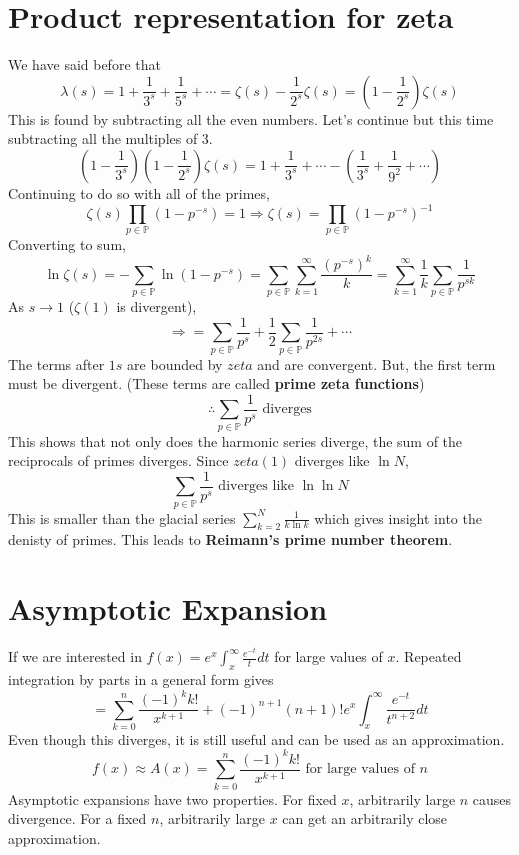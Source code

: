 \documentclass[../main.tex]{subfiles}
\begin{document}
\section{Product representation for zeta}
    We have said before that
    $$\lambda(s)=1+\frac{1}{3^{s}}+\frac{1}{5^{s}}+\cdots=\zeta(s)-\frac{1}{2^{s}}\zeta(s)=(1-\frac{1}{2^{s}})\zeta(s)$$
    This is found by subtracting all the even numbers. Let's continue but this time subtracting all the multiples of 3.
    $$(1-\frac{1}{3^{s}})(1-\frac{1}{2^{s}})\zeta(s)=1+\frac{1}{3^{s}}+\cdots-\left(\frac{1}{3^{s}}+\frac{1}{9^{2}}+\cdots\right)$$
    Continuing to do so with all of the primes,
    $$\zeta(s)\prod_{p\in\mathbb{P}}(1-p^{-s})=1\Rightarrow\boxed{\zeta(s)=\prod_{p\in\mathbb{P}}(1-p^{-s})^{-1}}$$
    Converting to sum,
    $$\ln\zeta(s)=-\sum_{p\in\mathbb{P}}\ln(1-p^{-s})=\sum_{p\in\mathbb{P}}\sum_{k=1}^{\infty}\frac{(p^{-s})^{k}}{k}=\sum_{k=1}^{\infty}\frac{1}{k}\sum_{p\in\mathbb{P}}\frac{1}{p^{sk}}$$
    As $s\rightarrow 1$ ($\zeta(1)$ is divergent),
    $$\Rightarrow=\sum_{p\in\mathbb{P}}\frac{1}{p^{s}}+\frac{1}{2}\sum_{p\in\mathbb{P}}\frac{1}{p^{2s}}+\cdots$$
    The terms after $1s$ are bounded by $zeta$ and are convergent. But, the first term must be divergent. (These terms are called \textbf{prime zeta functions})
    $$\boxed{\therefore\sum_{p\in\mathbb{P}}\frac{1}{p^{s}}\text{ diverges}}$$
    This shows that not only does the harmonic series diverge, the sum of the reciprocals of primes diverges. Since $zeta(1)$ diverges like $\ln N$,
    $$\sum_{p\in\mathbb{P}}\frac{1}{p^{s}}\text{ diverges like }\ln\ln N$$
    This is smaller than the glacial series $\sum_{k=2}^{N}\frac{1}{k\ln k}$ which gives insight into the denisty of primes. This leads to \textbf{Reimann's prime number theorem}.

\section{Asymptotic Expansion}
If we are interested in $f(x)=e^{x}\int_{x}^{\infty}\frac{e^{-t}}{t}dt$ for large values of $x.$
Repeated integration by parts in a general form gives 
$$=\sum_{k=0}^{n}\frac{(-1)^{k}k!}{x^{k+1}}+(-1)^{n+1}(n+1)!e^{x}\int_{x}^{\infty}\frac{e^{-t}}{t^{n+2}}dt$$
Even though this diverges, it is still useful and can be used as an approximation.
$$f(x)\approx A(x)=\sum_{k=0}^{n}\frac{(-1)^{k}k!}{x^{k+1}} \text{ for large values of } n$$
Asymptotic expansions have two properties. For fixed $x$, arbitrarily large $n$ causes divergence. For a fixed $n$,
arbitrarily large $x$ can get an arbitrarily close approximation.
\end{document}
